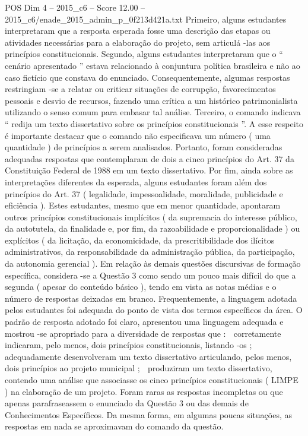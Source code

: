 \begin{textsample}{POS Dim 4 – 2015\_c6 – Score 12.00 – 2015\_c6/enade\_2015\_admin\_p\_0f213d421a.txt}
Primeiro, alguns estudantes interpretaram que a resposta esperada fosse uma descrição das etapas ou atividades necessárias para a elaboração do projeto, sem articulá -las aos princípios constitucionais.
Segundo, alguns estudantes interpretaram que o “ cenário apresentado ” estava relacionado à conjuntura política brasileira e não ao caso fictício que constava do enunciado.
Consequentemente, algumas respostas restringiam -se a relatar ou criticar situações de corrupção, favorecimentos pessoais e desvio de recursos, fazendo uma crítica a um histórico patrimonialista utilizando o senso comum para embasar tal análise.
Terceiro, o comando indicava “ redija um texto dissertativo sobre os princípios constitucionais ”.
A esse respeito é importante destacar que o comando não especificava um número ( uma quantidade ) de princípios a serem analisados.
Portanto, foram consideradas adequadas respostas que contemplaram de dois a cinco princípios do Art. 37 da Constituição Federal de 1988 em um texto dissertativo.
Por fim, ainda sobre as interpretações diferentes da esperada, alguns estudantes foram além dos princípios do Art. 37 ( legalidade, impessoalidade, moralidade, publicidade e eficiência ).
Estes estudantes, mesmo que em menor quantidade, apontaram outros princípios constitucionais implícitos ( da supremacia do interesse público, da autotutela, da finalidade e, por fim, da razoabilidade e proporcionalidade ) ou explícitos ( da licitação, da economicidade, da prescritibilidade dos ilícitos administrativos, da responsabilidade da administração pública, da participação, da autonomia gerencial ).
Em relação às demais questões discursivas de formação específica, considera -se a Questão 3 como sendo um pouco mais difícil do que a segunda ( apesar do conteúdo básico ), tendo em vista as notas médias e o número de respostas deixadas em branco.
Frequentemente, a linguagem adotada pelos estudantes foi adequada do ponto de vista dos termos específicos da área.
O padrão de resposta adotado foi claro, apresentou uma linguagem adequada e mostrou -se apropriado para a diversidade de respostas que :  corretamente indicaram, pelo menos, dois princípios constitucionais, listando -os ;  adequadamente desenvolveram um texto dissertativo articulando, pelos menos, dois princípios ao projeto municipal ;  produziram um texto dissertativo, contendo uma análise que associasse os cinco princípios constitucionais ( LIMPE ) na elaboração de um projeto.
Foram raras as respostas incompletas ou que apenas parafraseassem o enunciado da Questão 3 ou das demais de Conhecimentos Específicos.
Da mesma forma, em algumas poucas situações, as respostas em nada se aproximavam do comando da questão.

\end{textsample}
